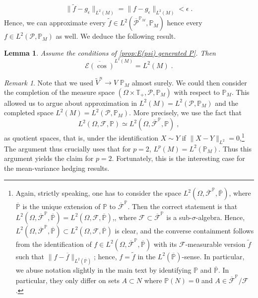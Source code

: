\documentclass[11pt]{report}
\theoremstyle{plain} %
\newtheorem{lemma}[lemma]{Lemma}
\theoremstyle{definition} %
\theoremstyle{remark} %
\newtheorem{remark}[remark]{Remark}
\begin{document}
 \begin{equation}
     \lVert \widetilde{f}-g_{\epsilon}\rVert_{L^2(M)}=\lVert f-g_{\epsilon}\rVert_{L^2(M)}<\epsilon\;.
 \end{equation}
 Hence, we can approximate every \(\widetilde{f}\in L^2(\overline{\mathcal{P}}^{\mathbb{P}_M},\mathbb{P}_M)\) hence every \(f\in L^2(\mathcal{P},\mathbb{P}_M)\) as well. We deduce the following result.
\begin{lemma}\label{lemma:density of E(cos) in L2(M)}
Assume the conditions of \cref{prop:E(psi) generated P}. Then 
\begin{equation}
    \overline{\mathcal{E}(\cos)}^{L^2(M)}=L^2(M)\;.
\end{equation}
\end{lemma}
\begin{remark}
    Note that we used \(\widetilde{V}^n\to V\) \(\mathbb{P}_M\) almost surely. We could then consider the completion of the measure space \((\Omega\times\mathbb{T}_+, \mathcal{P},\mathbb{P}_M)\) with respect to \(\mathbb{P}_M\). This allowed us to argue about approximation in \(L^2(M)=L^2(\mathcal{P},\mathbb{P}_M)\) and the completed space \(L^2(M)=L^2(\mathcal{P},\mathbb{P}_M)\). More precisely, we use the fact that 
    \begin{equation}
        L^2(\Omega,\mathcal{F},\mathbb{P})\simeq  L^2(\Omega,\overline{\mathcal{F}}^{\mathbb{P}},\mathbb{P})\;,
    \end{equation}
    as quotient spaces, that is, under the identification \(X\sim Y\) if \(\lVert X-Y\rVert_{L^2}=0\),\footnote{ Again, strictly speaking, one has to consider the space \(L^2(\Omega,\overline{\mathcal{F}}^{\mathbb{P}},\overline{\mathbb{P}})\), where \(\overline{\mathbb{P}}\) is the unique extension of \(\mathbb{P}\) to \(\overline{\mathcal{F}}^{\mathbb{P}}\). Then the correct statement is that \(L^2(\Omega,\overline{\mathcal{F}}^{\mathbb{P}},\overline{\mathbb{P}})=L^2(\Omega,\mathcal{F},\overline{\mathbb{P}})\),, where \(\mathcal{F}\subset\overline{\mathcal{F}}^{\mathbb{P}}\) is a sub-\(\sigma\)-algebra. Hence, \(L^2(\Omega,\overline{\mathcal{F}}^{\mathbb{P}},\overline{\mathbb{P}})\subset L^2(\Omega,\mathcal{F},\overline{\mathbb{P}})\) is clear, and the converse containment follows from the identification of \(f\in L^2(\Omega,\overline{\mathcal{F}}^{\mathbb{P}},\overline{\mathbb{P}})\) with its \(\mathcal{F}\)-measurable version \(\widetilde{f}\) such that \(\lVert f-\overline{f}\rVert_{L^2(\overline{\mathbb{P}})}\); hence, \(f=\widetilde{f}\) in the \(L^2(\overline{\mathbb{P}})\)-sense. In particular, we abuse notation slightly in the main text by identifying \(\mathbb{P}\) and \(\overline{\mathbb{P}}\). In particular, they only differ on sets \(A\subset N\) where \(\mathbb{P}(N)=0\) and \(A\in\overline{\mathcal{F}}^{\mathbb{P}}/\mathcal{F}\).}
    The argument thus crucially uses that for \(p=2\), \(L^p(M)=L^2(\mathbb{P}_M)\). Thus this argument yields the claim for \(p=2\). Fortunately, this is the interesting case for the mean-variance hedging results. 
\end{remark}
\end{document}
